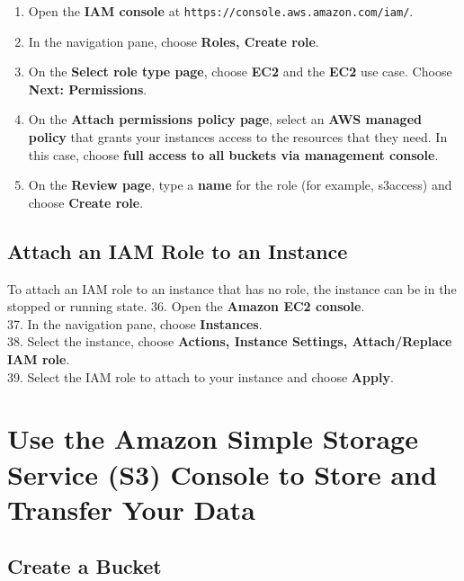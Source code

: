 \documentclass[]{book}
\providecommand{\tightlist}{%
  \setlength{\itemsep}{0pt}\setlength{\parskip}{0pt}}
\begin{document}
\begin{enumerate}
\def\labelenumi{\arabic{enumi}.}
\setcounter{enumi}{30}
\tightlist
\item
  Open the \textbf{IAM console} at \texttt{https://console.aws.amazon.com/iam/}.
\item
  In the navigation pane, choose \textbf{Roles, Create role}.
\item
  On the \textbf{Select role type page}, choose \textbf{EC2} and the \textbf{EC2} use case. Choose \textbf{Next: Permissions}.
\item
  On the \textbf{Attach permissions policy page}, select an \textbf{AWS managed policy} that grants your instances access to the resources that they need. In this case, choose \textbf{full access to all buckets via management console}.
\item
  On the \textbf{Review page}, type a \textbf{name} for the role (for example, s3access) and choose \textbf{Create role}.
\end{enumerate}

\hypertarget{attach-an-iam-role-to-an-instance}{%
\section{Attach an IAM Role to an Instance}\label{attach-an-iam-role-to-an-instance}}

To attach an IAM role to an instance that has no role, the instance can be in the stopped or running state.
36. Open the \textbf{Amazon EC2 console}.\\
37. In the navigation pane, choose \textbf{Instances}.\\
38. Select the instance, choose \textbf{Actions, Instance Settings, Attach/Replace IAM role}.\\
39. Select the IAM role to attach to your instance and choose \textbf{Apply}.

\hypertarget{use-the-amazon-simple-storage-service-s3-console-to-store-and-transfer-your-data}{%
\chapter{Use the Amazon Simple Storage Service (S3) Console to Store and Transfer Your Data}\label{use-the-amazon-simple-storage-service-s3-console-to-store-and-transfer-your-data}}

\hypertarget{create-a-bucket}{%
\section{Create a Bucket}\label{create-a-bucket}}
\end{document}

